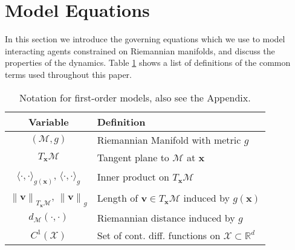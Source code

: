 \documentclass[11pt]{article}
\newcommand{\mbf}[1]{\boldsymbol{#1}}
\newcommand{\inprod}[1]{\langle #1 \rangle}
\newcommand{\norm}[1]{\left\| #1 \right\|}
\newcommand{\R}{\mathbb{R}}
\newcommand{\bv}{\mbf{v}}
\newcommand{\bx}{\mbf{x}}
\newcommand{\mM}{\mathcal{M}}
\newcommand{\mX}{\mathcal{X}}
\begin{document}
\section{Model Equations}
% 
In this section we introduce the governing equations which we use to model interacting agents constrained on Riemannian manifolds, and discuss the properties of the dynamics.
Table \ref{tab:common_def} shows a list of definitions of the common terms used throughout this paper.
\begin{table}[H]
\vskip-0.25cm
\centering
\small{
\small{\begin{tabular}{ c | l }
\hline
Variable                         & Definition \\
\hline\hline
$(\mM, g)$                       & Riemannian Manifold with metric $g$ \\
\hline
$T_{\bx}\mM$                     & Tangent plane to $\mM$ at $\bx$\\
\hline
$\inprod{\cdot, \cdot}_{g(\bx)}$, $\inprod{\cdot, \cdot}_{g}$ & Inner product on $T_{\bx}\mM$ \\
\hline
$\norm{\bv}_{T_{\bx}\mM}$, $\norm{\bv}_{g}$         & Length of $\bv \in T_{\bx}\mM$ induced by $g(\bx)$\\
\hline
$d_{\mM}(\cdot, \cdot)$          & Riemannian distance induced by $g$\\
\hline
$C^1(\mX)$                       & Set of cont. diff. functions on $\mX \subset \R^d$ \\
\hline
\end{tabular}}  
}
\caption{Notation for first-order models, also see the Appendix.}
\label{tab:common_def} 
\vskip-0.5cm
\end{table}
%
\end{document}
